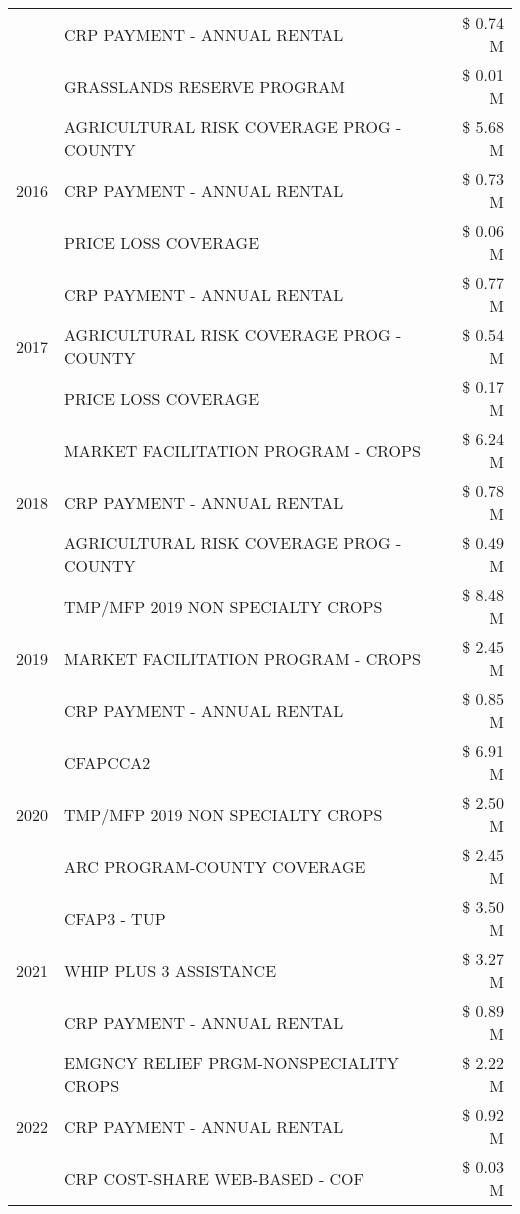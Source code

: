 \begin{tabular}{llr}
 & CRP PAYMENT - ANNUAL RENTAL & \$ 0.74 M \\
 & GRASSLANDS RESERVE PROGRAM & \$ 0.01 M \\
\cline{1-3}
\multirow[t]{3}{*}{2016} & AGRICULTURAL RISK COVERAGE PROG - COUNTY & \$ 5.68 M \\
 & CRP PAYMENT - ANNUAL RENTAL & \$ 0.73 M \\
 & PRICE LOSS COVERAGE & \$ 0.06 M \\
\cline{1-3}
\multirow[t]{3}{*}{2017} & CRP PAYMENT - ANNUAL RENTAL & \$ 0.77 M \\
 & AGRICULTURAL RISK COVERAGE PROG - COUNTY & \$ 0.54 M \\
 & PRICE LOSS COVERAGE & \$ 0.17 M \\
\cline{1-3}
\multirow[t]{3}{*}{2018} & MARKET FACILITATION PROGRAM - CROPS & \$ 6.24 M \\
 & CRP PAYMENT - ANNUAL RENTAL & \$ 0.78 M \\
 & AGRICULTURAL RISK COVERAGE PROG - COUNTY & \$ 0.49 M \\
\cline{1-3}
\multirow[t]{3}{*}{2019} & TMP/MFP 2019 NON SPECIALTY CROPS & \$ 8.48 M \\
 & MARKET FACILITATION PROGRAM - CROPS & \$ 2.45 M \\
 & CRP PAYMENT - ANNUAL RENTAL & \$ 0.85 M \\
\cline{1-3}
\multirow[t]{3}{*}{2020} & CFAPCCA2 & \$ 6.91 M \\
 & TMP/MFP 2019 NON SPECIALTY CROPS & \$ 2.50 M \\
 & ARC PROGRAM-COUNTY COVERAGE & \$ 2.45 M \\
\cline{1-3}
\multirow[t]{3}{*}{2021} & CFAP3 - TUP & \$ 3.50 M \\
 & WHIP PLUS 3 ASSISTANCE & \$ 3.27 M \\
 & CRP PAYMENT - ANNUAL RENTAL & \$ 0.89 M \\
\cline{1-3}
\multirow[t]{3}{*}{2022} & EMGNCY RELIEF PRGM-NONSPECIALITY CROPS & \$ 2.22 M \\
 & CRP PAYMENT - ANNUAL RENTAL & \$ 0.92 M \\
 & CRP COST-SHARE WEB-BASED - COF & \$ 0.03 M \\
\cline{1-3}
\bottomrule
\end{tabular}
